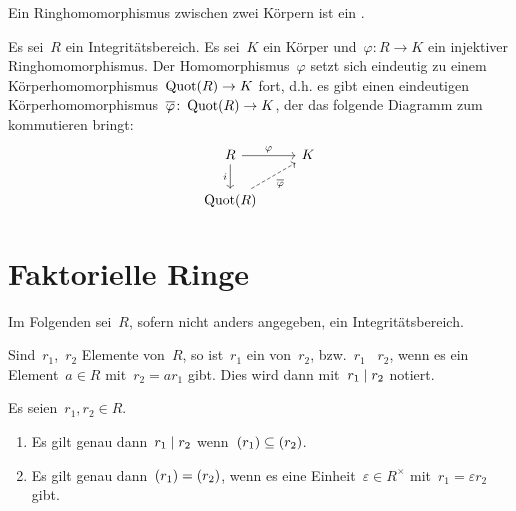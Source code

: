 
\begin{definition}
  Ein Ringhomomorphismus zwischen zwei Körpern ist ein .
\end{definition}

\begin{corollary}
  Es sei~$R$ ein Integritätsbereich.
  Es sei~$K$ ein Körper und~$\varphi \colon R \to K$ ein injektiver Ringhomomorphismus.
  Der Homomorphismus~$\varphi$ setzt sich eindeutig zu einem Körperhomomorphismus~$\Quot(R) \to K$ fort, d.h. es gibt einen eindeutigen Körperhomomorphismus~$\induced{\varphi} \colon \Quot(R) \to K$, der das folgende Diagramm zum kommutieren bringt:
  \[
    \begin{tikzcd}
      R
      \arrow{r}[above]{\varphi}
      \arrow{d}[left]{i}
      &
      K
      \\
      \Quot(R)
      \arrow[dashed]{ur}[below right]{\induced{\varphi}}
      &
      {}
    \end{tikzcd}
  \]
\end{corollary}





\section{Faktorielle Ringe}

\begin{convention}
  Im Folgenden sei~$R$, sofern nicht anders angegeben, ein Integritätsbereich.
\end{convention}

\begin{definition}
  Sind~$r_1$,~$r_2$ Elemente von~$R$, so ist~$r_1$ ein  von~$r_2$, bzw.~$r_1$ ~$r_2$, wenn es ein Element~$a \in R$ mit~$r_2 = a r_1$ gibt.
  Dies wird dann mit~$r_1 \mid r_2$ notiert.
\end{definition}

\begin{proposition}
  Es seien~$r_1, r_2 \in R$.
  \begin{enumerate}
    \item
      Es gilt genau dann~$r_1 \mid r_2$ wenn~$(r_1) \subseteq (r_2)$.
    \item
      Es gilt genau dann~$(r_1) = (r_2)$, wenn es eine Einheit~$\varepsilon \in R^\times$ mit~$r_1 = \varepsilon r_2$ gibt.
  \end{enumerate}
\end{proposition}

